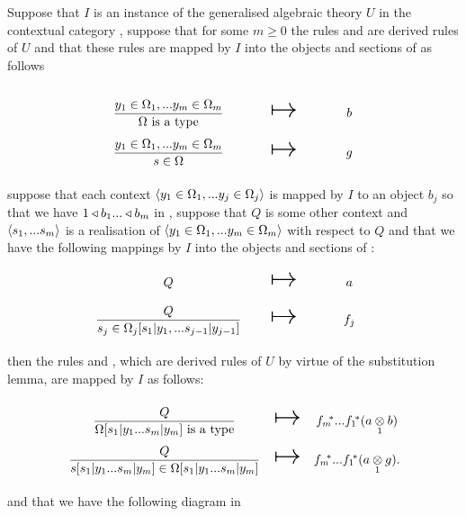 { %
\newcommand {\forceSOURCEwidth}{\rule{5cm}{0pt}}  %
\newcommand {\forceTARGETwidth}{\rule{2.2cm}{0pt}}
\begin{lemma}

\newcommand{\sjrule}   {\gatdisplayrule{Q}         {\ofT{s_j}{\Omega_j[s_1|y_1,...s_{j-1}|y_{j-1}]}}}
\newcommand{\omegarule}{\gatdisplayrule{\yOmega{m}}{\isT{\Omega}}}
\newcommand{\srule}    {\gatdisplayrule{\yOmega{m}}{\ofT{s}{\Omega}}}
\newcommand{\omegarulesubstituted}{\gatdisplayrule{Q}{\isT{\Omega[s_1|y_1...s_m|y_m]}} }
\newcommand{\srulesubstituted}{\gatdisplayrule{Q}{\ofT{s[s_1|y_1...s_m|y_m]}{\Omega[s_1|y_1...s_m|y_m]}} }

Suppose that $I$ is an instance of the generalised algebraic theory $U$ in the contextual category \catc,
suppose that for some $m \geq 0$ the rules  \omegarule  and \srule are derived rules of $U$
and that these rules are mapped by $I$ into the objects and sections of \catcw as follows


\begin{equation*}
\begin{array}{c c c}
\forceSOURCEwidth & & \forceTARGETwidth \\ [-0.1cm]
\omegarule & \Imapsto & b   \\ [0.4cm]
\srule     & \Imapsto & g
\end{array}
\end{equation*}
suppose that each context $\langle y_1 \in \Omega_1,... y_{j} \in \Omega_{j}\rangle$  is mapped by $I$ to an object $b_j$ so that we have 
$1 \triangleleft b_1 ... \triangleleft b_m$ in \catc,
suppose  that $Q$ is some other context and $\langle s_1,...s_m\rangle$ is a realisation of $\langle y_1 \in \Omega_1,... y_{m} \in \Omega_{m}\rangle$ with respect to $Q$
and that we have the following mappings by $I$ into the objects and sections of \catc:
\begin{equation*}
\begin{array}{c c c}
\forceSOURCEwidth & & \forceTARGETwidth \\ [-0.1cm]
Q          & \Imapsto & a   \\ [0.4cm]
\sjrule    & \Imapsto & f_j \\ [0.4cm]
\end{array}
\end{equation*}
then the rules \omegarulesubstituted and  \srulesubstituted, which are derived rules of $U$ by virtue of the substitution lemma, are mapped by $I$ as follows:
\begin{equation*}
\begin{array}{c c c}
\forceSOURCEwidth & & \forceTARGETwidth \\ [-0.1cm]
\omegarulesubstituted  & \Imapsto & \fmstar...\fonestar (\crossx{a}{b}{1})   \\ [0.4cm]
\srulesubstituted      & \Imapsto & \fmstar...\fonestar (\crossx{a}{g}{1}).
\end{array}
\end{equation*}
and  that we have the following diagram in \catc


\end{lemma}}
